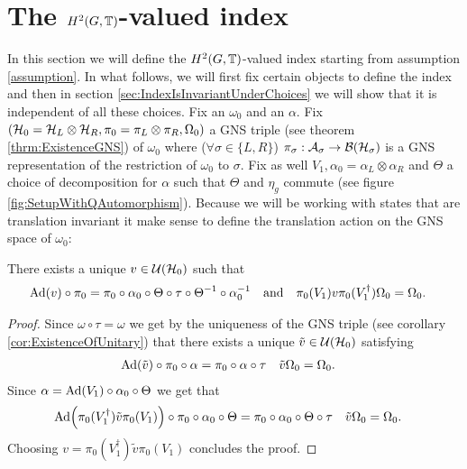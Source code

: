 \documentclass[11pt,a4paper,twoside]{article}
\numberwithin{equation}{section}
\begin{document}
\section{The $H^2(G,\mathbb T)$-valued index}\label{sec:ProofFirstStatement}
In this section we will define the $H^2(G,\mathbb T)$-valued index starting from assumption \ref{assumption}. In what follows, we will first fix certain objects to define the index and then in section \ref{sec:IndexIsInvariantUnderChoices} we will show that it is independent of all these choices. Fix an $\omega_0$ and an $\alpha$. Fix $(\mathcal H_0=\mathcal H_L\otimes\mathcal H_R,\pi_0=\pi_L\otimes\pi_R,\Omega_0)$ a GNS triple (see theorem \ref{thrm:ExistenceGNS}) of $\omega_0$ where ($\forall\sigma\in\{L,R\}$) $\pi_\sigma:\mathcal A_\sigma\rightarrow\mathcal B(\mathcal H_\sigma)$ is a GNS representation of the restriction of $\omega_0$ to $\sigma$. Fix as well $V_1,\alpha_0=\alpha_L\otimes\alpha_R$ and $\Theta$ a choice of decomposition for $\alpha$ such that $\Theta$ and $\eta_g$ commute (see figure \ref{fig:SetupWithQAutomorphism}). Because we will be working with states that are translation invariant it make sense to define the translation action on the GNS space of $\omega_0$:
\begin{lemma}\label{lem:Definition_v}
	There exists a unique $v\in\mathcal U(\mathcal H_0)$ such that
	\begin{align}
		\Ad{v}\circ\pi_0&=\pi_0\circ\alpha_0\circ\Theta\circ\tau\circ\Theta^{-1}\circ\alpha_0^{-1}&&\text{and}&\pi_0(V_1)v\pi_0(V_1^\dagger)\Omega_0&=\Omega_0.
	\end{align}
\end{lemma}
\begin{proof}
	Since $\omega\circ\tau=\omega$ we get by the uniqueness of the GNS triple (see corollary \ref{cor:ExistenceOfUnitary}) that there exists a unique $\tilde{v}\in\mathcal U(\mathcal H_0)$ satisfying
	\begin{align}
		\Ad{\tilde{v}}\circ\pi_0\circ\alpha&=\pi_0\circ\alpha\circ\tau&\tilde{v}\Omega_0&=\Omega_0.
	\end{align}
	Since $\alpha=\Ad{V_1}\circ\alpha_0\circ\Theta$ we get that
	\begin{align}
		\Ad{\pi_0(V_1^\dagger)\tilde{v}\pi_0(V_1)}\circ\pi_0\circ\alpha_0\circ\Theta&=\pi_0\circ\alpha_0\circ\Theta\circ\tau&\tilde{v}\Omega_0&=\Omega_0.
	\end{align}
	Choosing $v=\pi_0(V_1^\dagger)\tilde{v}\pi_0(V_1)$  concludes the proof.
\end{proof}
\end{document}
